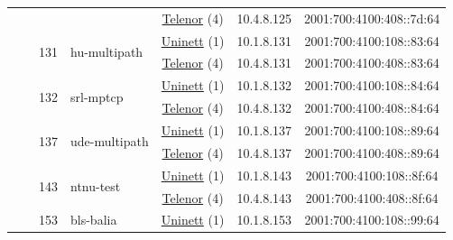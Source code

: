 \begin{small}
\begin{center}
\begin{longtable}{|c|c|c|c|c|c|c|c|}
  &  &  &  & \multicolumn{2}{|c|}{\tiny{\href{https://www.telenor.no}{Telenor} (4)}} & \tiny{10.4.8.125} & \tiny{2001:700:4100:408::7d:64} \\* \cline{3-3}\cline{4-4}\cline{5-5}\cline{6-6}\cline{7-7}\cline{8-8}
  &  & \multirow{2}{*}{\tiny{131}} & \multicolumn{1}{|l|}{\multirow{2}{*}{\tiny{hu-multipath}}} & \multicolumn{2}{|c|}{\tiny{\href{https://www.uninett.no}{Uninett} (1)}} & \tiny{10.1.8.131} & \tiny{2001:700:4100:108::83:64} \\* \cline{5-5}\cline{6-6}\cline{7-7}\cline{8-8}
  &  &  &  & \multicolumn{2}{|c|}{\tiny{\href{https://www.telenor.no}{Telenor} (4)}} & \tiny{10.4.8.131} & \tiny{2001:700:4100:408::83:64} \\* \cline{3-3}\cline{4-4}\cline{5-5}\cline{6-6}\cline{7-7}\cline{8-8}
  &  & \multirow{2}{*}{\tiny{132}} & \multicolumn{1}{|l|}{\multirow{2}{*}{\tiny{srl-mptcp}}} & \multicolumn{2}{|c|}{\tiny{\href{https://www.uninett.no}{Uninett} (1)}} & \tiny{10.1.8.132} & \tiny{2001:700:4100:108::84:64} \\* \cline{5-5}\cline{6-6}\cline{7-7}\cline{8-8}
  &  &  &  & \multicolumn{2}{|c|}{\tiny{\href{https://www.telenor.no}{Telenor} (4)}} & \tiny{10.4.8.132} & \tiny{2001:700:4100:408::84:64} \\* \cline{3-3}\cline{4-4}\cline{5-5}\cline{6-6}\cline{7-7}\cline{8-8}
  &  & \multirow{2}{*}{\tiny{137}} & \multicolumn{1}{|l|}{\multirow{2}{*}{\tiny{ude-multipath}}} & \multicolumn{2}{|c|}{\tiny{\href{https://www.uninett.no}{Uninett} (1)}} & \tiny{10.1.8.137} & \tiny{2001:700:4100:108::89:64} \\* \cline{5-5}\cline{6-6}\cline{7-7}\cline{8-8}
  &  &  &  & \multicolumn{2}{|c|}{\tiny{\href{https://www.telenor.no}{Telenor} (4)}} & \tiny{10.4.8.137} & \tiny{2001:700:4100:408::89:64} \\* \cline{3-3}\cline{4-4}\cline{5-5}\cline{6-6}\cline{7-7}\cline{8-8}
  &  & \multirow{2}{*}{\tiny{143}} & \multicolumn{1}{|l|}{\multirow{2}{*}{\tiny{ntnu-test}}} & \multicolumn{2}{|c|}{\tiny{\href{https://www.uninett.no}{Uninett} (1)}} & \tiny{10.1.8.143} & \tiny{2001:700:4100:108::8f:64} \\* \cline{5-5}\cline{6-6}\cline{7-7}\cline{8-8}
  &  &  &  & \multicolumn{2}{|c|}{\tiny{\href{https://www.telenor.no}{Telenor} (4)}} & \tiny{10.4.8.143} & \tiny{2001:700:4100:408::8f:64} \\* \cline{3-3}\cline{4-4}\cline{5-5}\cline{6-6}\cline{7-7}\cline{8-8}
  &  & \multirow{2}{*}{\tiny{153}} & \multicolumn{1}{|l|}{\multirow{2}{*}{\tiny{bls-balia}}} & \multicolumn{2}{|c|}{\tiny{\href{https://www.uninett.no}{Uninett} (1)}} & \tiny{10.1.8.153} & \tiny{2001:700:4100:108::99:64} \\* \cline{5-5}\cline{6-6}\cline{7-7}\cline{8-8}

\end{longtable}
\end{center}
\end{small}
